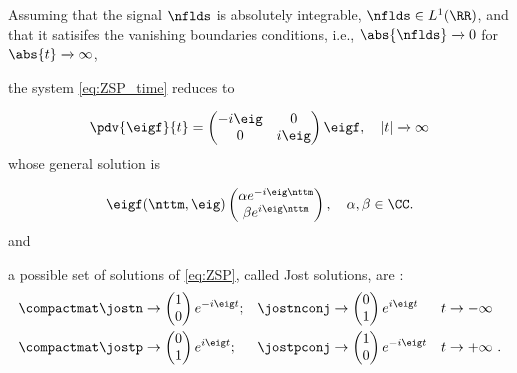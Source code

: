 Assuming that the signal $\nflds$ is absolutely integrable, $\nflds \in L^1(\RR)$, and that it satisifes the vanishing
boundaries conditions, i.e., $\abs{ \nflds }\xrightarrow{} 0$ for
$\abs{t} \xrightarrow{} \infty$,
\begin{extendedthesis}
    the system \eqref{eq:ZSP_time} reduces to

    \begin{equation}\label{eq:zsp_at_boundary}
    \pdv{\eigf}{t} =
    \begin{pmatrix}
    -i \eig & 0\\
    0     & i \eig\\
    \end{pmatrix}
    \eigf,
    \quad
    |t|\xrightarrow{} \infty
    \end{equation}
    whose general solution is

    \begin{equation}
    \eigf(\nttm, \eig)
    \begin{pmatrix}
    \alpha e^{-i\eig\nttm}\\
    \beta e^{i\eig\nttm}
    \end{pmatrix},
    \quad
    \alpha, \beta \in \CC.
    \end{equation}
and
\end{extendedthesis}
 a possible set of solutions of \eqref{eq:ZSP}, called Jost solutions, are
\cite{Yousefi2014}:
\begin{subequations}\label{eq:jost}
  \begin{align}
  \compactmat
  \jostn &  \rightarrow \begin{pmatrix}
                1 \\
                0
              \end{pmatrix} e^{-i\eig t}; &
  \jostnconj & \rightarrow \begin{pmatrix}
                  0 \\
                  1
                \end{pmatrix} e^{i\eig t} &
  t & \rightarrow -\infty\\
  \compactmat
  \jostp & \rightarrow  \begin{pmatrix}
                0  \\
                1
              \end{pmatrix} e^{i\eig t}; &
  \jostpconj & \rightarrow \begin{pmatrix}
                  1 \\
                  0
                \end{pmatrix} e^{-i\eig t} &
  t & \rightarrow +\infty~.
  \end{align}
\end{subequations}
